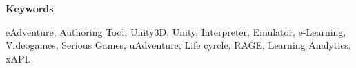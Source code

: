 \vspace{1cm}


\begin{center}

{\bf \Large Keywords}

   \end{center}

   \vspace{0.5cm}
eAdventure, Authoring Tool, Unity3D, Unity, Interpreter, Emulator, e-Learning, Videogames, Serious Games, uAdventure, Life cyrcle, RAGE, Learning Analytics, xAPI.

